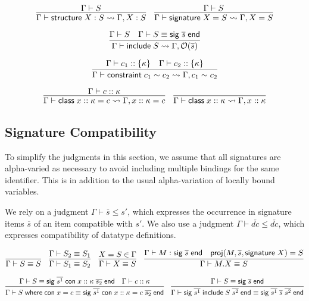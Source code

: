 \documentclass{article}
\newcommand{\mt}[1]{\mathsf{#1}}
\begin{document}
$$\infer{\Gamma \vdash \mt{structure} \; X : S \leadsto \Gamma, X : S}{
  \Gamma \vdash S
}
\quad \infer{\Gamma \vdash \mt{signature} \; X = S \leadsto \Gamma, X = S}{
  \Gamma \vdash S
}$$

$$\infer{\Gamma \vdash \mt{include} \; S \leadsto \Gamma, \mathcal O(\overline{s})}{
  \Gamma \vdash S
  & \Gamma \vdash S \equiv \mt{sig} \; \overline{s} \; \mt{end}
}$$

$$\infer{\Gamma \vdash \mt{constraint} \; c_1 \sim c_2 \leadsto \Gamma, c_1 \sim c_2}{
  \Gamma \vdash c_1 :: \{\kappa\}
  & \Gamma \vdash c_2 :: \{\kappa\}
}$$

$$\infer{\Gamma \vdash \mt{class} \; x :: \kappa = c \leadsto \Gamma, x :: \kappa = c}{
  \Gamma \vdash c :: \kappa
}
\quad \infer{\Gamma \vdash \mt{class} \; x :: \kappa \leadsto \Gamma, x :: \kappa}{}$$

\subsection{Signature Compatibility}

To simplify the judgments in this section, we assume that all signatures are alpha-varied as necessary to avoid including multiple bindings for the same identifier.  This is in addition to the usual alpha-variation of locally bound variables.

We rely on a judgment $\Gamma \vdash \overline{s} \leq s'$, which expresses the occurrence in signature items $\overline{s}$ of an item compatible with $s'$.  We also use a judgment $\Gamma \vdash \overline{dc} \leq \overline{dc}$, which expresses compatibility of datatype definitions.

$$\infer{\Gamma \vdash S \equiv S}{}
\quad \infer{\Gamma \vdash S_1 \equiv S_2}{
  \Gamma \vdash S_2 \equiv S_1
}
\quad \infer{\Gamma \vdash X \equiv S}{
  X = S \in \Gamma
}
\quad \infer{\Gamma \vdash M.X \equiv S}{
  \Gamma \vdash M : \mt{sig} \; \overline{s} \; \mt{end}
  & \mt{proj}(M, \overline{s}, \mt{signature} \; X) = S
}$$

$$\infer{\Gamma \vdash S \; \mt{where} \; \mt{con} \; x = c \equiv \mt{sig} \; \overline{s^1} \; \mt{con} \; x :: \kappa = c \; \overline{s_2} \; \mt{end}}{
  \Gamma \vdash S \equiv \mt{sig} \; \overline{s^1} \; \mt{con} \; x :: \kappa \; \overline{s_2} \; \mt{end}
  & \Gamma \vdash c :: \kappa
}
\quad \infer{\Gamma \vdash \mt{sig} \; \overline{s^1} \; \mt{include} \; S \; \overline{s^2} \; \mt{end} \equiv \mt{sig} \; \overline{s^1} \; \overline{s} \; \overline{s^2} \; \mt{end}}{
  \Gamma \vdash S \equiv \mt{sig} \; \overline{s} \; \mt{end}
}$$
\end{document}
